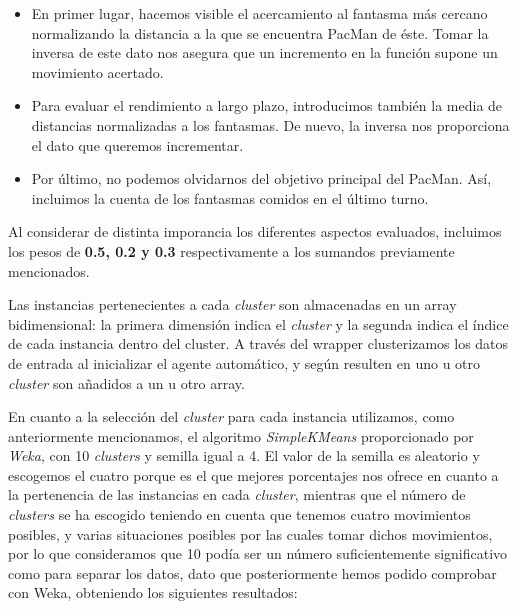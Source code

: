 \documentclass[12pt]{article}
\begin{document}
\begin{itemize}
    \item En primer lugar, hacemos visible el acercamiento al fantasma más cercano normalizando la distancia a la que se encuentra PacMan de éste. Tomar la inversa de este dato nos asegura que un incremento en la función supone un movimiento acertado.
    \item Para evaluar el rendimiento a largo plazo, introducimos también la media de distancias normalizadas a los fantasmas. De nuevo, la inversa nos proporciona el dato que queremos incrementar.
    \item Por último, no podemos olvidarnos del objetivo principal del PacMan. Así, incluimos la cuenta de los fantasmas comidos en el último turno.
\end{itemize}

Al considerar de distinta imporancia los diferentes aspectos evaluados, incluimos los pesos de \textbf{0.5, 0.2 y 0.3} respectivamente a los sumandos previamente mencionados.


Las instancias pertenecientes a cada \textit{cluster} son almacenadas en un array bidimensional: la primera dimensión indica el \textit{cluster} y la segunda indica el índice de cada instancia dentro del cluster. A través del wrapper clusterizamos los datos de entrada al inicializar el agente automático, y según resulten en uno u otro \textit{cluster} son añadidos a un u otro array.


En cuanto a la selección del \textit{cluster} para cada instancia utilizamos, como anteriormente mencionamos, el algoritmo \textit{SimpleKMeans} proporcionado por \textit{Weka}, con 10 \textit{clusters} y semilla igual a 4. El valor de la semilla es aleatorio y escogemos el cuatro porque es el que mejores porcentajes nos ofrece en cuanto a la pertenencia de las instancias en cada \textit{cluster}, mientras que el número de \textit{clusters} se ha escogido teniendo en cuenta que tenemos cuatro movimientos posibles, y varias situaciones posibles por las cuales tomar dichos movimientos, por lo que consideramos que 10 podía ser un número suficientemente significativo como para separar los datos, dato que posteriormente hemos podido comprobar con Weka, obteniendo los siguientes resultados:
\end{document}
